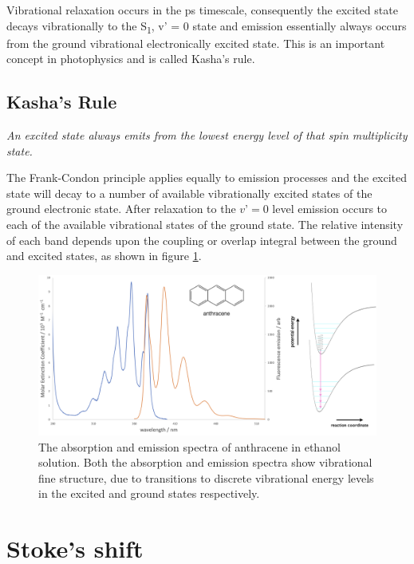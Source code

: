 \documentclass[
]{book}
\begin{document}
Vibrational relaxation occurs in the ps timescale, consequently the excited state decays vibrationally to the S\textsubscript{1}, v' = 0 state and emission essentially always occurs from the ground vibrational electronically excited state. This is an important concept in photophysics and is called Kasha's rule.

\hypertarget{sec:Kasha}{%
\subsection{Kasha's Rule}\label{sec:Kasha}}

\emph{An excited state always emits from the lowest energy level of that spin multiplicity state.}

The Frank-Condon principle applies equally to emission processes and the excited state will decay to a number of available vibrationally excited states of the ground electronic state. After relaxation to the \(v’ = 0\) level emission occurs to each of the available vibrational states of the ground state. The relative intensity of each band depends upon the coupling or overlap integral between the ground and excited states, as shown in figure \ref{fig:anthracenekasha}.

\begin{figure}

{\centering \includegraphics[width=0.7\linewidth]{images/anthracenekasha} 

}

\caption{The absorption and emission spectra of anthracene in ethanol solution. Both the absorption and emission spectra show vibrational fine structure, due to transitions to discrete vibrational energy levels in the excited and ground states respectively.}\label{fig:anthracenekasha}
\end{figure}

\hypertarget{sec:stoke}{%
\section{Stoke's shift}\label{sec:stoke}}
\end{document}
